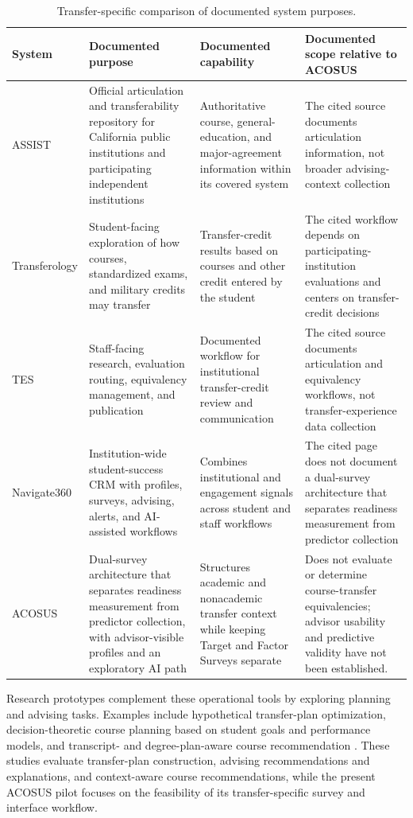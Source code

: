 \documentclass[letterpaper,11pt]{article}
\begin{document}
\begin{table}[htbp]
\caption{Transfer-specific comparison of documented system purposes.}
\label{tab:comparison}
\centering
{\renewcommand{\arraystretch}{1.16}
\begin{tabular}{@{}p{2.6cm}p{4.0cm}p{4.0cm}p{4.5cm}@{}}
\toprule
\textbf{System} & \textbf{Documented purpose} & \textbf{Documented capability} & \textbf{Documented scope relative to ACOSUS} \\
\midrule
ASSIST & Official articulation and transferability repository for California public institutions and participating independent institutions & Authoritative course, general-education, and major-agreement information within its covered system & The cited source documents articulation information, not broader advising-context collection \\
\addlinespace[3pt]
Transferology & Student-facing exploration of how courses, standardized exams, and military credits may transfer & Transfer-credit results based on courses and other credit entered by the student & The cited workflow depends on participating-institution evaluations and centers on transfer-credit decisions \\
\addlinespace[3pt]
TES & Staff-facing research, evaluation routing, equivalency management, and publication & Documented workflow for institutional transfer-credit review and communication & The cited source documents articulation and equivalency workflows, not transfer-experience data collection \\
\addlinespace[3pt]
Navigate360 & Institution-wide student-success CRM with profiles, surveys, advising, alerts, and AI-assisted workflows & Combines institutional and engagement signals across student and staff workflows & The cited page does not document a dual-survey architecture that separates readiness measurement from predictor collection \\
\addlinespace[3pt]
ACOSUS & Dual-survey architecture that separates readiness measurement from predictor collection, with advisor-visible profiles and an exploratory AI path & Structures academic and nonacademic transfer context while keeping Target and Factor Surveys separate & Does not evaluate or determine course-transfer equivalencies; advisor usability and predictive validity have not been established. \\
\bottomrule
\end{tabular}
}
\end{table}

Research prototypes complement these operational tools by exploring planning and advising tasks. Examples include hypothetical transfer-plan optimization, decision-theoretic course planning based on student goals and performance models, and transcript- and degree-plan-aware course recommendation \parencites[pp.~3, 5, 12, 19]{nguyen2024optimal}[pp.~1, 4]{mattei2014advising}[pp.~1, 4--6]{mi2025smartcourse}. These studies evaluate transfer-plan construction, advising recommendations and explanations, and context-aware course recommendations, while the present ACOSUS pilot focuses on the feasibility of its transfer-specific survey and interface workflow.
\end{document}

